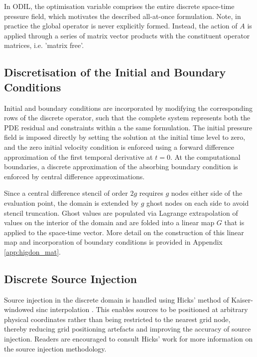 \documentclass[final-report]{report-template}
\begin{document}
In ODIL, the optimisation variable comprises the entire discrete space-time pressure field, which motivates the described all-at-once formulation. Note, in practice the global operator is never explicitly formed. Instead, the action of $A$ is applied through a series of matrix vector products with the constituent operator matrices, i.e. 'matrix free'. 

\subsection{Discretisation of the Initial and Boundary Conditions}
\label{subsubsect:disc_conditions}

Initial and boundary conditions are incorporated by modifying the corresponding rows of the discrete operator, such that the complete system represents both the PDE residual and constraints within a the same formulation. The initial pressure field is imposed directly by setting the solution at the initial time level to zero, and the zero initial velocity condition is enforced using a forward difference approximation of the first temporal derivative at $t=0$. At the computational boundaries, a discrete approximation of the absorbing boundary condition is enforced by central difference approximations.

Since a central difference stencil of order $2g$ requires $g$ nodes either side of the evaluation point, the domain is extended by $g$ ghost nodes on each side to avoid stencil truncation. Ghost values are populated via Lagrange extrapolation of values on the interior of the domain and are folded into a linear map $G$ that is applied to the space-time vector. More detail on the construction of this linear map and incorporation of boundary conditions is provided in Appendix \ref{app:higdon_mat}.

\subsection{Discrete Source Injection}
\label{subsect:disc_source_inj}
Source injection in the discrete domain is handled using Hicks' method of Kaiser-windowed sinc interpolation \cite{hicksArbitrarySourceReceiver2002}. This enables sources to be positioned at arbitrary physical coordinates rather than being restricted to the nearest grid node, thereby reducing grid positioning artefacts and improving the accuracy of source injection. Readers are encouraged to consult Hicks' work for more information on the source injection methodology.
\end{document}
